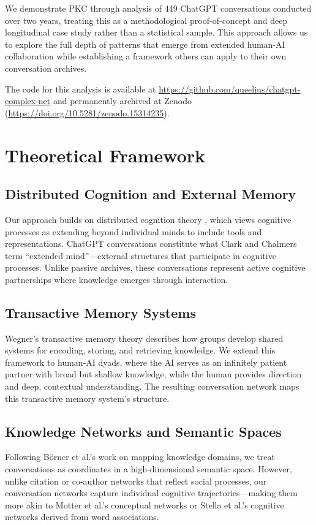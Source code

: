 \documentclass[10pt, a4paper]{article}
\begin{document}
We demonstrate PKC through analysis of 449 ChatGPT conversations conducted over two years, treating this as a methodological proof-of-concept and deep longitudinal case study rather than a statistical sample. This approach allows us to explore the full depth of patterns that emerge from extended human-AI collaboration while establishing a framework others can apply to their own conversation archives.

The code for this analysis is available at 
\url{https://github.com/queelius/chatgpt-complex-net} \cite{chatgpt-complex-net}
and permanently archived at Zenodo 
(\url{https://doi.org/10.5281/zenodo.15314235}).

\section{Theoretical Framework}

\subsection{Distributed Cognition and External Memory}
Our approach builds on distributed cognition theory \cite{hutchins1995}, which views cognitive processes as extending beyond individual minds to include tools and representations. ChatGPT conversations constitute what Clark and Chalmers \cite{clark1998} term ``extended mind''—external structures that participate in cognitive processes. Unlike passive archives, these conversations represent active cognitive partnerships where knowledge emerges through interaction.

\subsection{Transactive Memory Systems}
Wegner's transactive memory theory \cite{wegner1987} describes how groups develop shared systems for encoding, storing, and retrieving knowledge. We extend this framework to human-AI dyads, where the AI serves as an infinitely patient partner with broad but shallow knowledge, while the human provides direction and deep, contextual understanding. The resulting conversation network maps this transactive memory system's structure.

\subsection{Knowledge Networks and Semantic Spaces}
Following Börner et al.'s \cite{borner2003} work on mapping knowledge domains, we treat conversations as coordinates in a high-dimensional semantic space. However, unlike citation or co-author networks that reflect social processes, our conversation networks capture individual cognitive trajectories—making them more akin to Motter et al.'s \cite{motter2002} conceptual networks or Stella et al.'s \cite{stella2018} cognitive networks derived from word associations.
\end{document}
